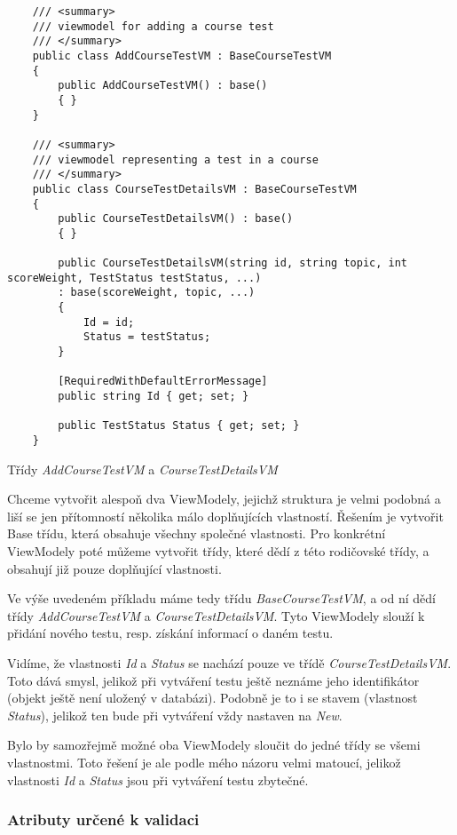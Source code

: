 \begin{program}
	\begin{lstlisting}
	/// <summary>
	/// viewmodel for adding a course test
	/// </summary>
	public class AddCourseTestVM : BaseCourseTestVM
	{
		public AddCourseTestVM() : base()
		{ }
	}
	
	/// <summary>
	/// viewmodel representing a test in a course
	/// </summary>
	public class CourseTestDetailsVM : BaseCourseTestVM
	{
		public CourseTestDetailsVM() : base()
		{ }
		
		public CourseTestDetailsVM(string id, string topic, int scoreWeight, TestStatus testStatus, ...)
		: base(scoreWeight, topic, ...)
		{
			Id = id;
			Status = testStatus;
		}
		
		[RequiredWithDefaultErrorMessage]
		public string Id { get; set; }
		
		public TestStatus Status { get; set; }
	}
	\end{lstlisting}
	\caption{Třídy \textit{AddCourseTestVM} a \textit{CourseTestDetailsVM}}
	\label{CourseTestChildVMs}
\end{program}
Chceme vytvořit alespoň dva ViewModely, jejichž struktura je velmi podobná a liší se jen přítomností několika málo doplňujících vlastností. Řešením je vytvořit Base třídu, která obsahuje všechny společné vlastnosti. Pro konkrétní ViewModely poté můžeme vytvořit třídy, které dědí z této rodičovské třídy, a obsahují již pouze doplňující vlastnosti.

Ve výše uvedeném příkladu máme tedy třídu \textit{BaseCourseTestVM}, a od ní dědí třídy \textit{AddCourseTestVM} a \textit{CourseTestDetailsVM}. Tyto ViewModely slouží k přidání nového testu, resp. získání informací o daném testu.

Vidíme, že vlastnosti \textit{Id} a \textit{Status} se nachází pouze ve třídě \textit{CourseTestDetailsVM}. Toto dává smysl, jelikož při vytváření testu ještě neznáme jeho identifikátor (objekt ještě není uložený v databázi).
Podobně je to i se stavem (vlastnost \textit{Status}), jelikož ten bude při vytváření vždy nastaven na \textit{New}.

Bylo by samozřejmě možné oba ViewModely sloučit do jedné třídy se všemi vlastnostmi. Toto řešení je ale podle mého názoru velmi matoucí, jelikož vlastnosti \textit{Id} a \textit{Status} jsou při vytváření testu zbytečné.

\subsubsection*{Atributy určené k validaci}

